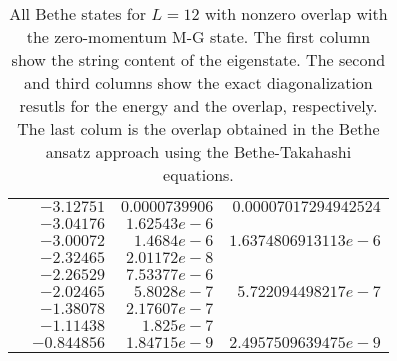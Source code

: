 \documentclass[12pt,a4paper,final]{iopart}
\begin{document}
\begin{table}[h]
\begin{tabular}{rrrr}
& $-3.12751$ & $0.0000739906$     & $0.00007017294942524$\\
& $-3.04176$ & $1.62543e-6$       &\\
& $-3.00072$ & $1.4684e-6$        & $1.6374806913113e-6$\\
& $-2.32465$ & $2.01172e-8$       &\\
& $-2.26529$ & $7.53377e-6$       &\\
& $-2.02465$ & $5.8028e-7$        & $5.722094498217e-7$\\
& $-1.38078$ & $2.17607e-7$       &\\
& $-1.11438$ & $1.825e-7$         &\\
& $-0.844856$& $1.84715e-9$       & $2.4957509639475e-9$\\
\bottomrule
\end{tabular}
\caption{All Bethe states for $L=12$ with nonzero overlap with the zero-momentum 
 M-G state. The first column show the string content of the eigenstate. The second 
 and third columns show the exact diagonalization resutls for the energy and the 
 overlap, respectively. The last colum is the overlap obtained in the Bethe ansatz 
 approach using the Bethe-Takahashi equations.
}
\label{table:RV:sumruleN12}
\end{table}
\end{document}
